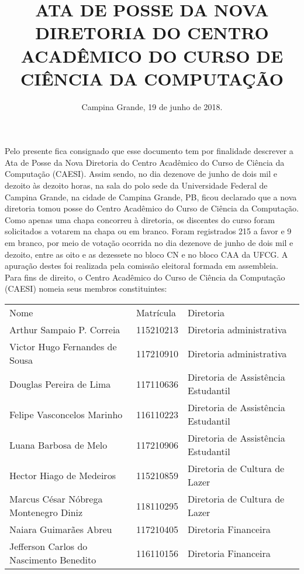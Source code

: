 \documentclass[11pt,letterpaper]{article}
\begin{document}
\title{ ATA DE POSSE DA NOVA DIRETORIA DO CENTRO ACADÊMICO DO CURSO DE CIÊNCIA DA COMPUTAÇÃO }
\date{Campina Grande, 19 de junho de 2018.}
\maketitle

Pelo presente fica consignado que esse documento tem por finalidade descrever a Ata de Posse da Nova Diretoria do Centro Acadêmico do Curso de Ciência da Computação (CAESI). Assim sendo, no dia dezenove de junho de dois mil e dezoito às dezoito horas, na sala do polo sede da Universidade Federal de Campina Grande, na cidade de Campina Grande, PB, ficou declarado que a nova diretoria tomou posse do Centro Acadêmico do Curso de Ciência da Computação. \\

Como apenas uma chapa concorreu à diretoria, os discentes do curso foram solicitados a votarem na chapa ou em branco. Foram registrados 215 a favor e 9 em branco, por meio de votação ocorrida no dia dezenove de junho de dois mil e dezoito, entre as oito e as dezessete no bloco CN e no bloco CAA da UFCG. A apuração destes foi realizada pela comissão eleitoral formada em assembleia. \\

Para fins de direito, o Centro Acadêmico do Curso de Ciência da Computação (CAESI) nomeia seus membros constituintes:\\

\begin{center}
\begin{tabular}{|l|l|l|}
\hline
Nome & Matrícula & Diretoria \\
Arthur Sampaio P. Correia & 115210213 & Diretoria administrativa \\
Victor Hugo Fernandes de Sousa & 117210910 & Diretoria administrativa \\
Douglas Pereira de Lima & 117110636 & Diretoria de Assistência Estudantil \\
Felipe Vasconcelos Marinho & 116110223 & Diretoria de Assistência Estudantil \\
Luana Barbosa de Melo & 117210906 & Diretoria de Assistência Estudantil \\
Hector Hiago de Medeiros & 115210859 & Diretoria de Cultura de Lazer \\
Marcus César Nóbrega Montenegro Diniz & 118110295 & Diretoria de Cultura de Lazer \\
Naiara Guimarães Abreu & 117210405 &  Diretoria Financeira \\
Jefferson Carlos do Nascimento Benedito & 116110156 & Diretoria Financeira \\
\hline
\end{tabular}\\
\end{center}
\end{document}
